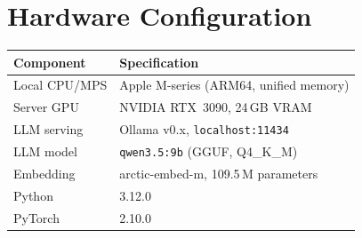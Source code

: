 \section{Hardware Configuration}
\label{app:hardware}

\noindent
\begin{tabular}{ll}
  \toprule
  Component & Specification \\
  \midrule
  Local CPU/MPS & Apple M-series (ARM64, unified memory) \\
  Server GPU    & NVIDIA RTX~3090, 24\,GB VRAM \\
  LLM serving   & Ollama v0.x, \texttt{localhost:11434} \\
  LLM model     & \texttt{qwen3.5:9b} (GGUF, Q4\_K\_M) \\
  Embedding     & arctic-embed-m, 109.5\,M parameters \\
  Python        & 3.12.0 \\
  PyTorch       & 2.10.0 \\
  \bottomrule
\end{tabular}
